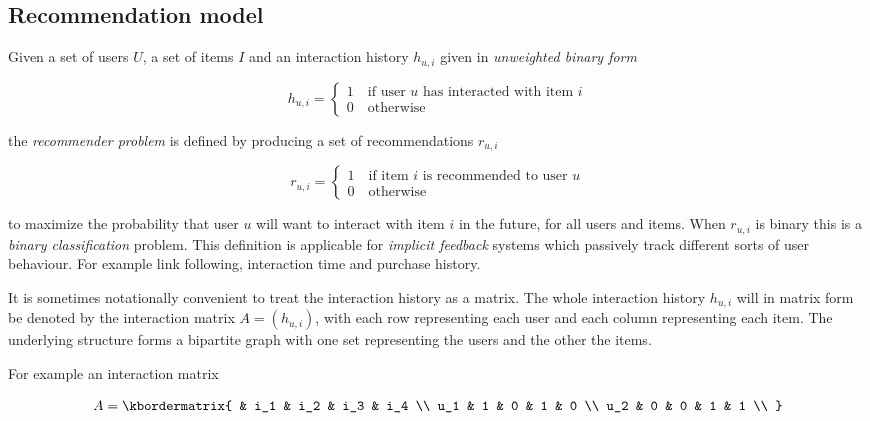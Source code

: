 
\subsection{Recommendation model}\label{sec:background:theory:model}

Given a set of users $U$, a set of items $I$ and an interaction history $h_{u, i}$ given in \textit{unweighted binary form}

\begin{equation}\label{eq:hist}
    h_{u, i} = \begin{cases}
        1 \quad \text{if user $u$ has interacted with item $i$} \\
        0 \quad \text{otherwise}
    \end{cases}
\end{equation}

the \textit{recommender problem} is defined by producing a set of recommendations $r_{u, i}$

\begin{equation}\label{eq:binrec}
    r_{u, i} = \begin{cases}
        1 \quad \text{if item $i$ is recommended to user $u$} \\
        0 \quad \text{otherwise}
    \end{cases}
\end{equation}

to maximize the probability that user $u$ will want to interact with item $i$ in the future, for all users and items.  When $r_{u, i}$ is binary this is a \textit{binary classification} problem. This definition is applicable for \textit{implicit feedback} systems which passively track different sorts of user behaviour. For example link following, interaction time and purchase history.

It is sometimes notationally convenient to treat the interaction history as a matrix. The whole interaction history $h_{u, i}$ will in matrix form be denoted by the interaction matrix $A = (h_{u, i})$, with each row representing each user and each column representing each item. The underlying structure forms a bipartite graph with one set representing the users and the other the items.

For example an interaction matrix

\[
  A = \kbordermatrix{
    &   i_1 & i_2 & i_3 & i_4 \\
    u_1 & 1 & 0 & 1 & 0 \\
    u_2 & 0 & 0 & 1 & 1 \\
  }
\]

